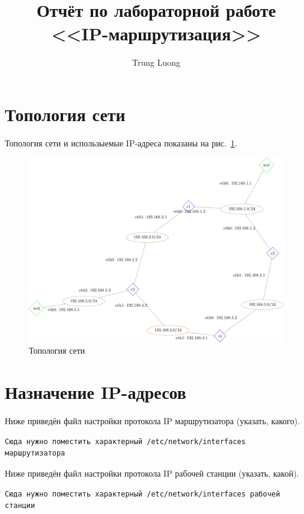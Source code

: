 \documentclass[a4paper,12pt]{article}
\title{Отчёт по лабораторной работе \\ <<IP-маршрутизация>>}
\author{Trung Luong}
\begin{document}
\maketitle

\tableofcontents


\section{Топология сети}

Топология сети и использыемые IP-адреса показаны на рис.~\ref{fig:network}.

\begin{figure}
\centering
\includegraphics[width=\textwidth]{includes/network_gv.pdf}
\caption{Топология сети}
\label{fig:network}
\end{figure}


\section{Назначение IP-адресов}

Ниже приведён файл настройки протокола IP маршрутизатора (указать, какого).

\begin{Verbatim}
Сюда нужно поместить характерный /etc/network/interfaces маршрутизатора
\end{Verbatim}

Ниже приведён файл настройки протокола IP рабочей станции (указать, какой).

\begin{Verbatim}
Сюда нужно поместить характерный /etc/network/interfaces рабочей станции
\end{Verbatim}
\end{document}
